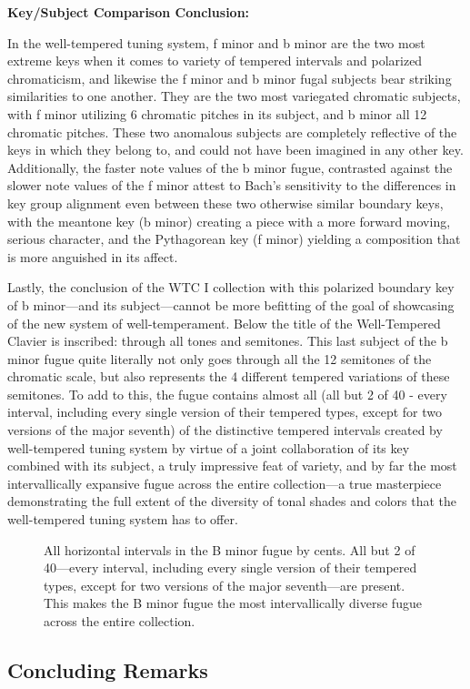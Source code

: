 \textbf{Key/Subject Comparison Conclusion:}

In the well-tempered tuning system, f minor and b minor are the two most
extreme keys when it comes to variety of tempered intervals and
polarized chromaticism, and likewise the f minor and b minor fugal
subjects bear striking similarities to one another. They are the two
most variegated chromatic subjects, with f minor utilizing 6 chromatic
pitches in its subject, and b minor all 12 chromatic pitches. These two
anomalous subjects are completely reflective of the keys in which they
belong to, and could not have been imagined in any other key.
Additionally, the faster note values of the b minor fugue, contrasted
against the slower note values of the f minor attest to Bach's
sensitivity to the differences in key group alignment even between these
two otherwise similar boundary keys, with the meantone key (b minor)
creating a piece with a more forward moving, serious character, and the
Pythagorean key (f minor) yielding a composition that is more anguished
in its affect.

Lastly, the conclusion of the WTC I collection with this polarized
boundary key of b minor---and its subject---cannot be more
befitting of the goal of showcasing of the new system of
well-temperament. Below the title of the Well-Tempered Clavier is
inscribed: through all tones and semitones. This last subject of the b
minor fugue quite literally not only goes through all the 12 semitones
of the chromatic scale, but also represents the 4 different tempered
variations of these semitones. To add to this, the fugue contains almost
all (all but 2 of 40 - every interval, including every single version of
their tempered types, except for two versions of the major seventh) of
the distinctive tempered intervals created by well-tempered tuning
system by virtue of a joint collaboration of its key combined with its
subject, a truly impressive feat of variety, and by far the most
intervallically expansive fugue across the entire collection---a
true masterpiece demonstrating the full extent of the diversity of tonal
shades and colors that the well-tempered tuning system has to offer.




\begin{figure}[H]
\vspace{1.5em}
    \centering
    \caption[All horizontal intervals in the B minor fugue by cents. ]{All horizontal intervals in the B minor fugue by cents. All but 2 of 40---every interval, including every single version of their tempered types, except for two versions of the major seventh---are present. This makes the B minor fugue the most intervallically diverse fugue across the entire collection.}
\end{figure}    \subsection{Concluding Remarks}\label{concluding-remarks}

